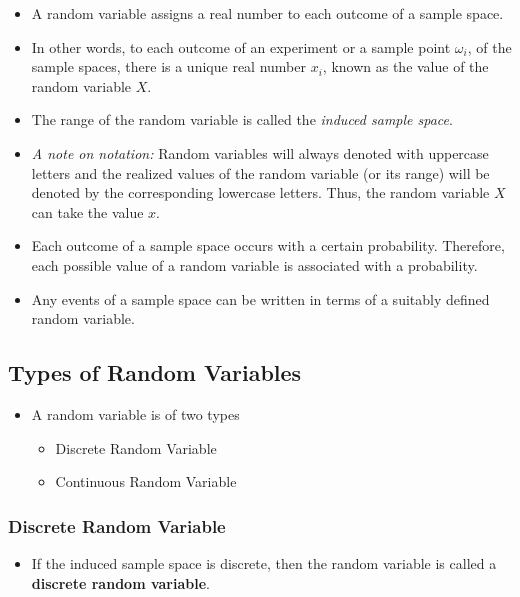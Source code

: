 \documentclass[]{book}
\providecommand{\tightlist}{%
  \setlength{\itemsep}{0pt}\setlength{\parskip}{0pt}}
\begin{document}
\begin{itemize}
\tightlist
\item
  A random variable assigns a real number to each outcome of a sample space.
\item
  In other words, to each outcome of an experiment or a sample point \(\omega_i\), of the sample spaces, there is a unique real number \(x_i\), known as the value of the random variable \(X\).
\item
  The range of the random variable is called the \emph{induced sample space}.
\item
  \emph{A note on notation:} Random variables will always denoted with uppercase letters and the realized values of the random variable (or its range) will be denoted by the corresponding lowercase letters. Thus, the random variable \(X\) can take the value \(x\).
\item
  Each outcome of a sample space occurs with a certain probability. Therefore, each possible value of a random variable is associated with a probability.
\item
  Any events of a sample space can be written in terms of a suitably defined random variable.
\end{itemize}

\hypertarget{types-of-random-variables}{%
\subsection{Types of Random Variables}\label{types-of-random-variables}}

\begin{itemize}
\tightlist
\item
  A random variable is of two types

  \begin{itemize}
  \tightlist
  \item
    Discrete Random Variable
  \item
    Continuous Random Variable
  \end{itemize}
\end{itemize}

\hypertarget{discrete-random-variable}{%
\subsubsection{Discrete Random Variable}\label{discrete-random-variable}}

\begin{itemize}
\tightlist
\item
  If the induced sample space is discrete, then the random variable is called a \textbf{discrete random variable}.
\end{itemize}
\end{document}
